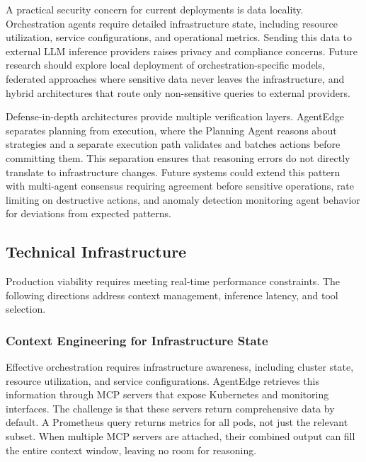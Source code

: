 A practical security concern for current deployments is data locality. Orchestration agents require detailed infrastructure state, including resource utilization, service configurations, and operational metrics. Sending this data to external \ac{LLM} inference providers raises privacy and compliance concerns. Future research should explore local deployment of orchestration-specific models, federated approaches where sensitive data never leaves the infrastructure, and hybrid architectures that route only non-sensitive queries to external providers.

Defense-in-depth architectures provide multiple verification layers. \ac{AgentEdge} separates planning from execution, where the Planning Agent reasons about strategies and a separate execution path validates and batches actions before committing them. This separation ensures that reasoning errors do not directly translate to infrastructure changes. Future systems could extend this pattern with multi-agent consensus requiring agreement before sensitive operations, rate limiting on destructive actions, and anomaly detection monitoring agent behavior for deviations from expected patterns.

\subsection{Technical Infrastructure}
\label{subsec:ch6_technical_infrastructure}

Production viability requires meeting real-time performance constraints. The following directions address context management, inference latency, and tool selection.

\subsubsection{Context Engineering for Infrastructure State}
\label{subsubsec:ch6_context_engineering}

Effective orchestration requires infrastructure awareness, including cluster state, resource utilization, and service configurations. \ac{AgentEdge} retrieves this information through \ac{MCP} servers that expose Kubernetes and monitoring interfaces. The challenge is that these servers return comprehensive data by default. A Prometheus query returns metrics for all pods, not just the relevant subset. When multiple \ac{MCP} servers are attached, their combined output can fill the entire context window, leaving no room for reasoning.

